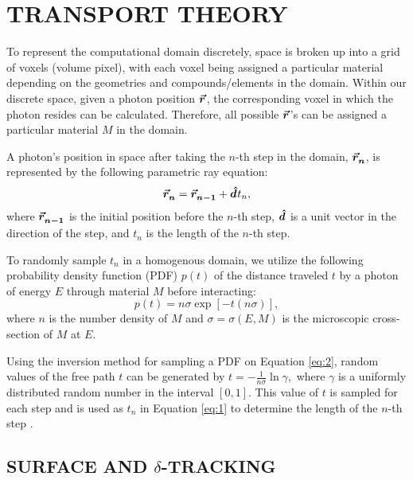 \section{TRANSPORT THEORY}
\par To represent the computational domain discretely, space is broken up into a grid of voxels (volume pixel), with each voxel being assigned a particular material depending on the geometries and compounds/elements in the domain. Within our discrete space, given a photon position $\bm{\vec{r}_{}^{}}$, the corresponding voxel in which the photon resides can be calculated. Therefore, all possible $\bm{\vec{r}_{}^{}}$'s can be assigned a particular material $M$ in the domain.

\par A photon's position in space after taking the $n$-th step in the domain, $\bm{\vec{r}_{n}^{}}$, is represented by the following parametric ray equation:
\begin{equation} \label{eq:1}
    \bm{\vec{r}_{n}^{}} = \bm{\vec{r}_{n-1}^{}} + \bm{\hat{d}_{}^{}} t_n,
\end{equation}
where $\bm{\vec{r}_{n-1}^{}}$ is the initial position before the $n$-th step, $\bm{\hat{d}_{}^{}}$ is a unit vector in the direction of the step, and $t_n$ is the length of the $n$-th step.

\par To randomly sample $t_n$ in a homogenous domain, we utilize the following probability density function (PDF) $p(t)$ of the distance traveled $t$ by a photon of energy $E$ through material $M$ before interacting:
\begin{equation} \label{eq:2}
    p(t) = n\sigma \exp{\left[-t(n\sigma)\right]},
\end{equation}
where $n$ is the number density of $M$ and $\sigma = \sigma(E, M)$ is the microscopic cross-section of $M$ at $E$.
\par Using the inversion method for sampling a PDF on Equation \ref{eq:2}, random values of the free path $t$ can be generated by $
    t = -\frac{1}{n\sigma} \ln \gamma, 
    $
where $\gamma$ is a uniformly distributed random number in the interval $[0, 1]$. This value of $t$ is sampled for each step and is used as $t_n$ in Equation \ref{eq:1} to determine the length of the $n$-th step \cite{vassiliev_monte_2017}.

\subsection{SURFACE AND $\delta$-TRACKING}

